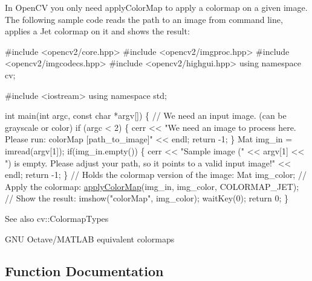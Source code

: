 In Open\+CV you only need apply\+Color\+Map to apply a colormap on a given image. The following sample code reads the path to an image from command line, applies a Jet colormap on it and shows the result\+: 


\begin{DoxyPre}
\begin{DoxyCode}
\textcolor{preprocessor}{#include <opencv2/core.hpp>}
\textcolor{preprocessor}{#include <opencv2/imgproc.hpp>}
\textcolor{preprocessor}{#include <opencv2/imgcodecs.hpp>}
\textcolor{preprocessor}{#include <opencv2/highgui.hpp>}
\textcolor{keyword}{using namespace }cv;

\textcolor{preprocessor}{#include <iostream>}
\textcolor{keyword}{using namespace }std;

\textcolor{keywordtype}{int} main(\textcolor{keywordtype}{int} argc, \textcolor{keyword}{const} \textcolor{keywordtype}{char} *argv[])
\{
    \textcolor{comment}{// We need an input image. (can be grayscale or color)}
    \textcolor{keywordflow}{if} (argc < 2)
    \{
        cerr << \textcolor{stringliteral}{"We need an image to process here. Please run: colorMap [path\_to\_image]"} << endl;
        \textcolor{keywordflow}{return} -1;
    \}
    Mat img\_in = imread(argv[1]);
    \textcolor{keywordflow}{if}(img\_in.empty())
    \{
        cerr << \textcolor{stringliteral}{"Sample image ("} << argv[1] << \textcolor{stringliteral}{") is empty. Please adjust your path, so it points to a
       valid input image!"} << endl;
        \textcolor{keywordflow}{return} -1;
    \}
    \textcolor{comment}{// Holds the colormap version of the image:}
    Mat img\_color;
    \textcolor{comment}{// Apply the colormap:}
    \hyperlink{group__imgproc__colormap_ga06d689b1055417421851333387c2b607}{applyColorMap}(img\_in, img\_color, COLORMAP\_JET);
    \textcolor{comment}{// Show the result:}
    imshow(\textcolor{stringliteral}{"colorMap"}, img\_color);
    waitKey(0);
    \textcolor{keywordflow}{return} 0;
\}
\end{DoxyCode}
 \end{DoxyPre}
 

\begin{DoxySeeAlso}{See also}
cv\+::\+Colormap\+Types 
\end{DoxySeeAlso}


G\+NU Octave/\+M\+A\+T\+L\+AB equivalent colormaps 

\subsection{Function Documentation}
\mbox{\label{group__imgproc__colormap_ga06d689b1055417421851333387c2b607}} 
